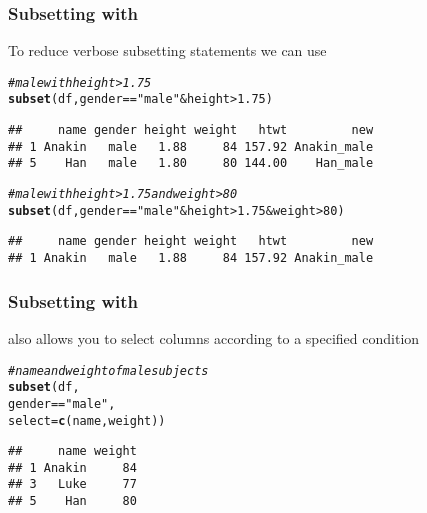 \documentclass[12pt]{beamer}\usepackage[]{graphicx}\usepackage[]{color}
\makeatletter
\newcommand{\hlnum}[1]{\textcolor[rgb]{0.686,0.059,0.569}{#1}}%
\newcommand{\hlstr}[1]{\textcolor[rgb]{0.192,0.494,0.8}{#1}}%
\newcommand{\hlcom}[1]{\textcolor[rgb]{0.678,0.584,0.686}{\textit{#1}}}%
\newcommand{\hlopt}[1]{\textcolor[rgb]{0,0,0}{#1}}%
\newcommand{\hlstd}[1]{\textcolor[rgb]{0.345,0.345,0.345}{#1}}%
\newcommand{\hlkwc}[1]{\textcolor[rgb]{0.333,0.667,0.333}{#1}}%
\newcommand{\hlkwd}[1]{\textcolor[rgb]{0.737,0.353,0.396}{\textbf{#1}}}%
\newenvironment{kframe}{%
 \def\at@end@of@kframe{}%
 \ifinner\ifhmode%
  \def\at@end@of@kframe{\end{minipage}}%
  \begin{minipage}{\columnwidth}%
 \fi\fi%
 \def\FrameCommand##1{\hskip\@totalleftmargin \hskip-\fboxsep
 \colorbox{shadecolor}{##1}\hskip-\fboxsep
     \hskip-\linewidth \hskip-\@totalleftmargin \hskip\columnwidth}%
 \MakeFramed {\advance\hsize-\width
   \@totalleftmargin\z@ \linewidth\hsize
   \@setminipage}}%
 {\par\unskip\endMakeFramed%
 \at@end@of@kframe}
\newenvironment{knitrout}{}{} %
\makeatother
\begin{document}
\begin{frame}[fragile]
\frametitle{Subsetting with }

To reduce verbose subsetting statements we can use 
\begin{knitrout}\footnotesize
{}\color{fgcolor}\begin{kframe}
\begin{alltt}
\hlcom{# male with height > 1.75}
\hlkwd{subset}\hlstd{(df, gender} \hlopt{==} \hlstr{"male"} \hlopt{&} \hlstd{height} \hlopt{>} \hlnum{1.75}\hlstd{)}
\end{alltt}
\begin{verbatim}
##     name gender height weight   htwt         new
## 1 Anakin   male   1.88     84 157.92 Anakin_male
## 5    Han   male   1.80     80 144.00    Han_male
\end{verbatim}
\begin{alltt}
\hlcom{# male with height > 1.75 and weight > 80}
\hlkwd{subset}\hlstd{(df, gender} \hlopt{==} \hlstr{"male"} \hlopt{&} \hlstd{height} \hlopt{>} \hlnum{1.75} \hlopt{&} \hlstd{weight} \hlopt{>} \hlnum{80}\hlstd{)}
\end{alltt}
\begin{verbatim}
##     name gender height weight   htwt         new
## 1 Anakin   male   1.88     84 157.92 Anakin_male
\end{verbatim}
\end{kframe}
\end{knitrout}

\end{frame}


\begin{frame}[fragile]
\frametitle{Subsetting with }

 also allows you to select columns according to a specified condition
\begin{knitrout}\footnotesize
{}\color{fgcolor}\begin{kframe}
\begin{alltt}
\hlcom{# name and weight of male subjects}
\hlkwd{subset}\hlstd{(df,}
       \hlstd{gender} \hlopt{==} \hlstr{"male"}\hlstd{,}
       \hlkwc{select} \hlstd{=} \hlkwd{c}\hlstd{(name, weight))}
\end{alltt}
\begin{verbatim}
##     name weight
## 1 Anakin     84
## 3   Luke     77
## 5    Han     80
\end{verbatim}
\end{kframe}
\end{knitrout}

\end{frame}
\end{document}
